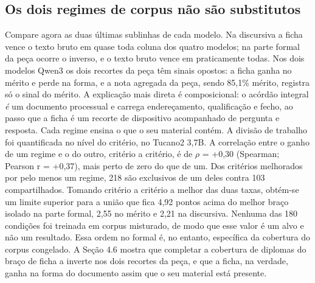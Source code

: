 \documentclass{IOS-Book-Article}
\begin{document}
\subsection{Os dois regimes de corpus não são substitutos}
Compare agora as duas últimas sublinhas de cada modelo. Na discursiva a ficha vence o texto bruto em quase toda coluna dos quatro modelos; na parte formal da peça ocorre o inverso, e o texto bruto vence em praticamente todas. Nos dois modelos Qwen3 os dois recortes da peça têm sinais opostos: a ficha ganha no mérito e perde na forma, e a nota agregada da peça, sendo 85,1\% mérito, registra só o sinal do mérito.
A explicação mais direta é composicional: o acórdão integral \emph{é} um documento processual e carrega endereçamento, qualificação e fecho, ao passo que a ficha é um recorte de dispositivo acompanhado de pergunta e resposta. Cada regime ensina o que o seu material contém. A divisão de trabalho foi quantificada no nível do critério, no Tucano2 3,7B. A correlação entre o ganho de um regime e o do outro, critério a critério, é de $\rho$ = +0,30 (Spearman; Pearson r = +0,37), mais perto de zero do que de um. Dos critérios melhorados por pelo menos um regime, 218 são exclusivos de um deles contra 103 compartilhados. Tomando critério a critério a melhor das duas taxas, obtém-se um limite superior para a união que fica 4,92 pontos acima do melhor braço isolado na parte formal, 2,55 no mérito e 2,21 na discursiva. Nenhuma das 180 condições foi treinada em corpus misturado, de modo que esse valor é um alvo e não um resultado.
Essa ordem no formal é, no entanto, específica da cobertura do corpus congelado. A Seção 4.6 mostra que completar a cobertura de diplomas do braço de ficha a inverte nos dois recortes da peça, e que a ficha, na verdade, ganha na forma do documento assim que o seu material está presente.
\end{document}
